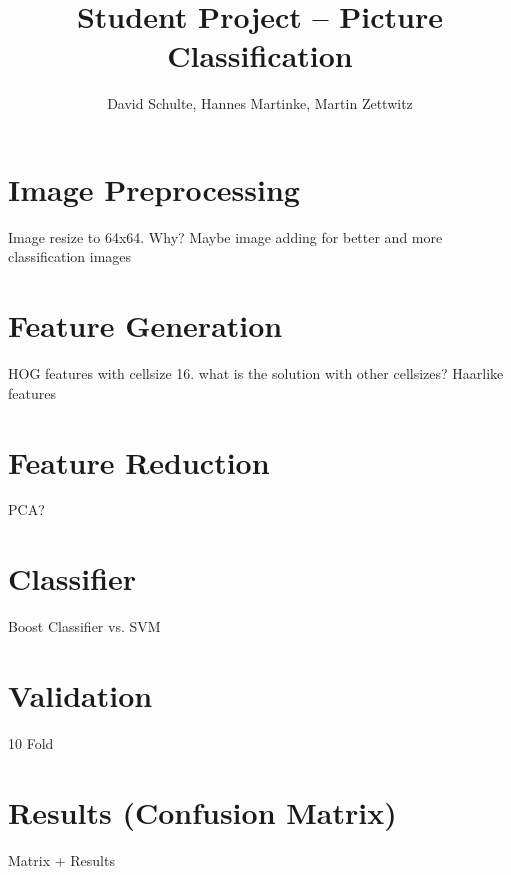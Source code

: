 \documentclass[a4paper,10pt]{article}
\title{Student  Project -- Picture Classification}
\author{David Schulte, Hannes Martinke, Martin Zettwitz}
\begin{document}
\maketitle
\section{Image Preprocessing}

Image resize to 64x64. Why?
Maybe image adding for better and more classification images
\section{Feature Generation}
HOG features with cellsize 16. what is the solution with other cellsizes?
Haarlike features
\section{Feature Reduction}
PCA?
\section{Classifier}
Boost Classifier vs. SVM
\section{Validation}
10 Fold
\section{Results (Confusion Matrix)}
Matrix + Results 
\end{document}
